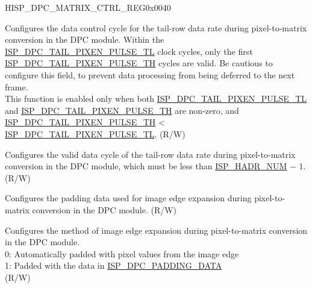 \begin{register}{H}{ISP\_DPC\_MATRIX\_CTRL\_REG}{0x0040}\label{regdesc:ISPDPCMATRIXCTRLREG}
%
%
%
%
%
\regnewline%
\begin{regdesc}\begin{reglist}
\label{fielddesc:ISPDPCTAILPIXENPULSETL}\item [ISP\_DPC\_TAIL\_PIXEN\_PULSE\_TL] Configures the data control cycle for the tail-row data rate during pixel-to-matrix conversion in the DPC module. Within the \hyperref[fielddesc:ISPDPCTAILPIXENPULSETL]{ISP\_DPC\_TAIL\_PIXEN\_PULSE\_TL} clock cycles, only the first \hyperref[fielddesc:ISPDPCTAILPIXENPULSETH]{ISP\_DPC\_TAIL\_PIXEN\_PULSE\_TH} cycles are valid. Be cautious to configure this field, to prevent data processing from being deferred to the next frame.\\
This function is enabled only when both \hyperref[fielddesc:ISPDPCTAILPIXENPULSETL]{ISP\_DPC\_TAIL\_PIXEN\_PULSE\_TL} and \hyperref[fielddesc:ISPDPCTAILPIXENPULSETH]{ISP\_DPC\_TAIL\_PIXEN\_PULSE\_TH} are non-zero, and \hyperref[fielddesc:ISPDPCTAILPIXENPULSETH]{ISP\_DPC\_TAIL\_PIXEN\_PULSE\_TH} < \hyperref[fielddesc:ISPDPCTAILPIXENPULSETL]{ISP\_DPC\_TAIL\_PIXEN\_PULSE\_TL}. (R/W)
\label{fielddesc:ISPDPCTAILPIXENPULSETH}\item [ISP\_DPC\_TAIL\_PIXEN\_PULSE\_TH] Configures the valid data cycle of the tail-row data rate during pixel-to-matrix conversion in the DPC module, which must be less than \hyperref[fielddesc:ISPHADRNUM]{ISP\_HADR\_NUM} − 1. (R/W)
\label{fielddesc:ISPDPCPADDINGDATA}\item [ISP\_DPC\_PADDING\_DATA] Configures the padding data used for image edge expansion during pixel-to-matrix conversion in the DPC module. (R/W)
\label{fielddesc:ISPDPCPADDINGMODE}\item [ISP\_DPC\_PADDING\_MODE] Configures the method of image edge expansion during pixel-to-matrix conversion in the DPC module.\\
0: Automatically padded with pixel values from the image edge\\
1: Padded with the data in \hyperref[fielddesc:ISPDPCPADDINGDATA]{ISP\_DPC\_PADDING\_DATA}\\(R/W)
\end{reglist}\end{regdesc}
\end{register}


